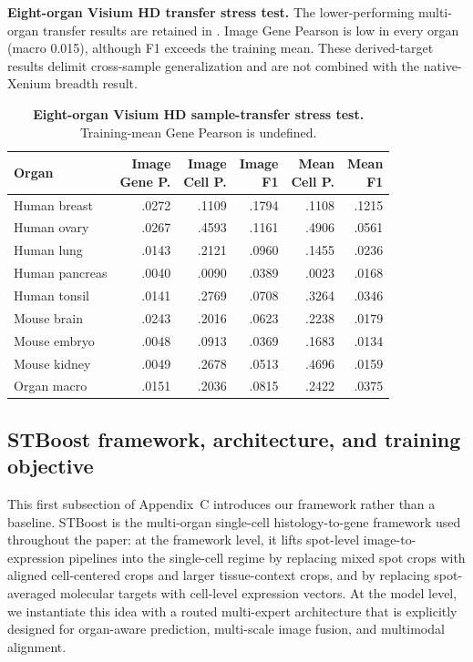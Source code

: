 \documentclass[sigconf,review]{acmart}
\begin{document}
\noindent\textbf{Eight-organ Visium HD transfer stress test.}
The lower-performing multi-organ transfer results are retained in
. Image Gene Pearson is low in every organ
(macro 0.015), although F1 exceeds the training mean. These derived-target
results delimit cross-sample generalization and are not combined with the
native-Xenium breadth result.

\begin{table}[H]
\centering
\scriptsize
\setlength{\tabcolsep}{1.8pt}
\caption{\textbf{Eight-organ Visium HD sample-transfer stress test.}
Training-mean Gene Pearson is undefined.}
\label{tab:appendix_hd_transfer}
\begin{tabular*}{\columnwidth}{@{\extracolsep{\fill}}lrrrrr@{}}
\toprule
Organ & \makecell{Image\\Gene P.} & \makecell{Image\\Cell P.} &
\makecell{Image\\F1} & \makecell{Mean\\Cell P.} & \makecell{Mean\\F1} \\
\midrule
Human breast & .0272 & .1109 & .1794 & .1108 & .1215 \\
Human ovary & .0267 & .4593 & .1161 & .4906 & .0561 \\
Human lung & .0143 & .2121 & .0960 & .1455 & .0236 \\
Human pancreas & .0040 & .0090 & .0389 & .0023 & .0168 \\
Human tonsil & .0141 & .2769 & .0708 & .3264 & .0346 \\
Mouse brain & .0243 & .2016 & .0623 & .2238 & .0179 \\
Mouse embryo & .0048 & .0913 & .0369 & .1683 & .0134 \\
Mouse kidney & .0049 & .2678 & .0513 & .4696 & .0159 \\
\midrule
Organ macro & .0151 & .2036 & .0815 & .2422 & .0375 \\
\bottomrule
\end{tabular*}
\end{table}

\FloatBarrier

\subsection{STBoost framework, architecture, and training objective}
\label{sec:STBoost_appendix_details}
\noindent
This first subsection of Appendix~C introduces our framework rather than a baseline. STBoost is the multi-organ single-cell histology-to-gene framework used throughout the paper: at the framework level, it lifts spot-level image-to-expression pipelines into the single-cell regime by replacing mixed spot crops with aligned cell-centered crops and larger tissue-context crops, and by replacing spot-averaged molecular targets with cell-level expression vectors. At the model level, we instantiate this idea with a routed multi-expert architecture that is explicitly designed for organ-aware prediction, multi-scale image fusion, and multimodal alignment.
\end{document}

